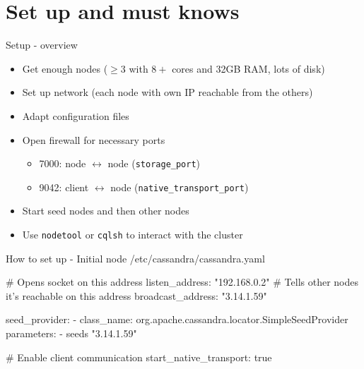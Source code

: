 \documentclass[
  10pt
]{beamer}
\begin{document}
\section{Set up and must knows}  %

\begin{frame}{Setup - overview}
  \begin{itemize}
    \item<1-> Get enough nodes ($\geq3$ with $8+$ cores and 32GB RAM, lots of disk)
    \item<2-> Set up network (each node with own IP reachable from the others)
    \item<3-> Adapt configuration files
    \item<4-> Open firewall for necessary ports
    \begin{itemize}
      \item 7000: node $\leftrightarrow$ node (\lstinline{storage_port})
      \item 9042: client $\leftrightarrow$ node (\lstinline{native_transport_port})
    \end{itemize}
    \item<5-> Start seed nodes and then other nodes
    \item<6-> Use \lstinline{nodetool} or \lstinline{cqlsh} to interact with the cluster
  \end{itemize}
\end{frame}

\begin{frame}[fragile]{How to set up - Initial node}
/etc/cassandra/cassandra.yaml
\begin{semiverbatim}
# Opens socket on this address
listen_address: "192.168.0.2"
# Tells other nodes it's reachable on this address
broadcast_address: "3.14.1.59"

seed_provider:
  - class_name: org.apache.cassandra.locator.SimpleSeedProvider
    parameters:
      - seeds "3.14.1.59"

# Enable client communication
start_native_transport: true
\end{semiverbatim}
\end{frame}
\end{document}
